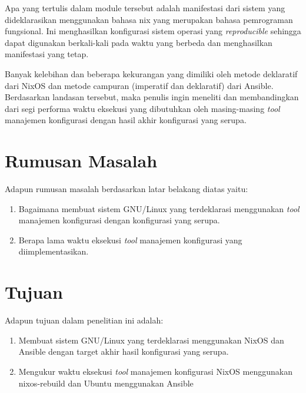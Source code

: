 \documentclass[10pt,]{report}
\begin{document}
\begin{adjustwidth}{0.70cm}{}
	Apa yang tertulis dalam module tersebut adalah manifestasi dari sistem yang
	dideklarasikan menggunakan bahasa nix yang merupakan bahasa pemrograman
	fungsional. Ini menghasilkan konfigurasi sistem operasi yang \textit{reproducible}
	sehingga dapat digunakan berkali-kali pada waktu yang berbeda dan
	menghasilkan manifestasi yang tetap.

	Banyak kelebihan dan beberapa kekurangan yang dimiliki oleh metode deklaratif
	dari NixOS dan metode campuran (imperatif dan deklaratif) dari Ansible.
	Berdasarkan landasan tersebut, maka penulis ingin meneliti dan membandingkan
	dari segi performa waktu eksekusi yang dibutuhkan oleh masing-masing
	\textit{tool} manajemen konfigurasi dengan hasil akhir konfigurasi yang serupa.
\end{adjustwidth}
\vspace{3mm}
\section{Rumusan Masalah}
\vspace{-3mm}
\begin{adjustwidth}{0.70cm}{}
	Adapun rumusan masalah berdasarkan latar belakang diatas yaitu:
	\begin{enumerate}[leftmargin=0.45cm]
		\item Bagaimana membuat sistem GNU/Linux yang terdeklarasi menggunakan \textit{tool}
		      manajemen konfigurasi dengan konfigurasi yang serupa.
		\item Berapa lama waktu eksekusi \textit{tool} manajemen konfigurasi yang diimplementasikan.
	\end{enumerate}
\end{adjustwidth}
\section{Tujuan}
\vspace{-3mm}
\begin{adjustwidth}{0.70cm}{}
	Adapun tujuan dalam penelitian ini adalah:
	\begin{enumerate}[leftmargin=0.45cm]
		\item Membuat sistem GNU/Linux yang terdeklarasi menggunakan NixOS dan
		      Ansible dengan target akhir hasil konfigurasi yang serupa.
		\item Mengukur waktu eksekusi \textit{tool} manajemen konfigurasi NixOS menggunakan nixos-rebuild
		      dan Ubuntu menggunakan Ansible
	\end{enumerate}
\end{adjustwidth}
\vspace{3mm}
\end{document}
